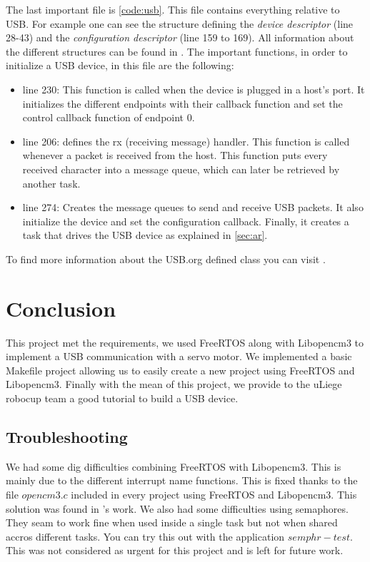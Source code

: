 \documentclass[12pt,a4paper]{report}
\begin{document}
The last important file is \ref{code:usb}. This file contains everything relative to USB. For example one can see the structure defining the \emph{device descriptor} (line 28-43) and the \emph{configuration descriptor} (line 159 to 169). All information about the different structures can be found in \cite{usbNutshell}. The important functions, in order to initialize a USB device, in this file are the following:
\begin{itemize}
    \item line 230: This function is called when the device is plugged in a host's port. It initializes the different endpoints with their callback function and set the control callback function of endpoint 0.
    \item line 206: defines the rx (receiving message) handler. This function is called whenever a packet is received from the host. This function puts every received character into a message queue, which can later be retrieved by another task.
    \item line 274: Creates the message queues to send and receive USB packets. It also initialize the device and set the configuration callback. Finally, it creates a task that drives the USB device as explained in \ref{sec:ar}.
\end{itemize}
To find more information about the USB.org defined class you can visit \cite{usbClass}.
\chapter{Conclusion}
This project met the requirements, we used FreeRTOS along with Libopencm3 to implement a USB communication with a servo motor. We implemented a basic Makefile  project allowing us to easily create a new project using FreeRTOS and Libopencm3. Finally with the mean of this project, we provide to the uLiege robocup team a good tutorial to build a USB device. 
\label{chap:concl}
\section{Troubleshooting}
\label{sec:trouble}
We had some dig difficulties combining FreeRTOS with Libopencm3. This is mainly due to the different interrupt name functions. This is fixed thanks to the file $opencm3.c$ included in every project using FreeRTOS and Libopencm3. This solution was found in \cite{Gay2018}'s work.\newline
We also had some difficulties using semaphores. They seam to work fine when used inside a single task but not when shared accros different tasks. You can try this out with the application $semphr-test$. This was not considered as urgent for this project and is left for future work.
\end{document}
